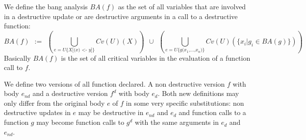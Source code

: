 \documentclass[12pt,a4paper]{article}
\newcommand{\cl}[1]{\texttt{#1}}
\newcommand{\ucont}[1]{\{#1\}}
\begin{document}
We define the bang analysis $BA(f)$ as the set of all variables that are involved in a destructive update or are destructive arguments in a call to a destructive function:
$$ BA(f) \ \ := \ \ \left( \bigcup_{e = U\ucont{X\cl{[(}x \cl{) <- } y \cl{]} }}  Cv(U)(X) \right) \ \ \cup \ \ \left( \bigcup_{e = U\ucont{g\cl{(} x_1\cl{,} ... \cl{,} x_n \cl{)}}} Cv(U)( \{ x_i | g_i \in BA(g) \}) \right)$$
Basically $BA(f)$ is the set of all critical variables in the evaluation of a function call to $f$.

We define two versions of all function declared. A non destructive version $f$ with body $e_{nd}$ and a destructive version $f^d$ with body $e_d$.
Both new definitions may only differ from the original body $e$ of $f$ in some very specific substitutions: non destructive updates in $e$ may be destructive in $e_{nd}$ and $e_d$ and function calls to a function $g$ may become function calls to $g^d$ with the same arguments in $e_d$ and $e_{nd}$.\\
\end{document}

